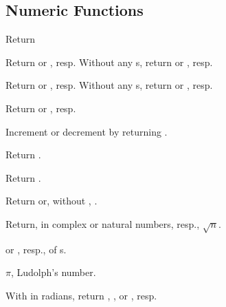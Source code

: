 \subsection{Numeric Functions} 

\begin{LIST}{1cm}

  Return 

  Return  or , resp. Without any
  s, return  or , resp.

  Return  or , resp. Without any
  s, return  or , resp.

   Return  or
  , resp.

  Increment or
  decrement  by  returning .

   Return .

   Return .

  Return  or,
  without , .

  Return, in complex or natural numbers, resp., $\sqrt{n}$.

   or , resp., of s. 

  $\pi$, Ludolph's number.

  With  in radians, return , , or , resp.


\end{LIST}
